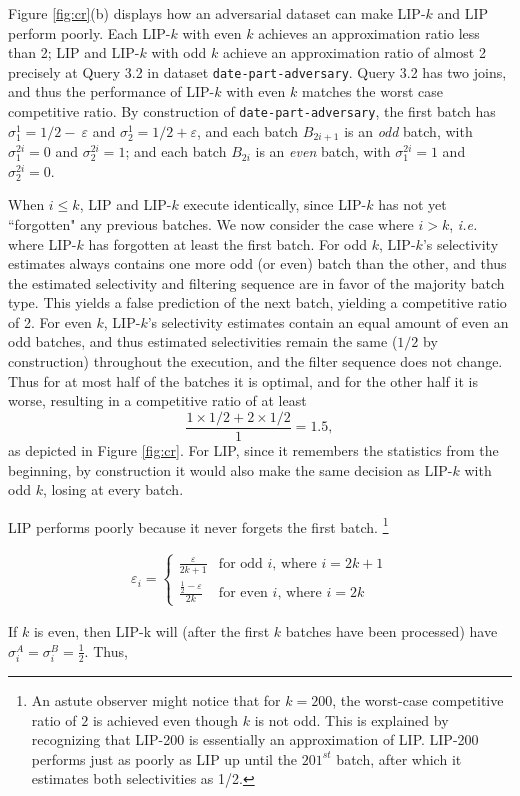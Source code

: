 Figure \ref{fig:cr}(b) displays how an adversarial dataset can make LIP-$k$ and LIP perform poorly. Each LIP-$k$ with even $k$ achieves an approximation ratio less than 2; LIP and LIP-$k$ with odd $k$ achieve an approximation ratio of almost 2 precisely at Query 3.2 in dataset \texttt{date-part-adversary}. Query 3.2 has two joins, and thus the performance of LIP-$k$ with even $k$ matches the worst case competitive ratio. By construction of \texttt{date-part-adversary}, the first batch has $\sigma^{1}_{1} = 1/2-\
\varepsilon$ and $\sigma^{1}_{2} = 1/2+\varepsilon$, and  each batch $B_{2i+1}$ is an \textit{odd} batch, with $\sigma^{2i}_{1} = 0$ and $\sigma^{2i}_{2} = 1$; and each batch $B_{2i}$ is an \textit{even} batch, with $\sigma^{2i}_{1} = 1$ and $\sigma^{2i}_{2} = 0$. 

When $i \leq k$, LIP and LIP-$k$ execute identically, since LIP-$k$ has not yet ``forgotten" any previous batches. We now consider the case where $i > k$, {\it i.e.} where LIP-$k$ has forgotten at least the first batch. For odd $k$, LIP-$k$'s selectivity estimates always contains one more odd (or even) batch than the other, and thus the estimated selectivity and filtering sequence are in favor of the majority batch type. This yields a false prediction of the next batch, yielding a competitive ratio of 2. For even $k$, LIP-$k$'s selectivity estimates contain an equal amount of even an odd batches,  and thus estimated selectivities remain the same ($1/2$ by construction) throughout the execution, and the filter sequence does not change. Thus for at most half of the batches it is optimal, and for the other half it is worse, resulting in a competitive ratio of at least \[ \frac{1 \times 1/2 + 2 \times 1/2}{1} = 1.5,\] as depicted in Figure \ref{fig:cr}. For LIP, since it remembers the statistics from the beginning, by construction it would also make the same decision as LIP-$k$ with odd $k$, losing at every batch. 

LIP performs poorly because it never forgets the first batch.
\footnote{An astute observer might notice that for $k = 200$, the worst-case competitive ratio of $2$ is achieved even though $k$ is not odd. This is explained by recognizing that LIP-200 is essentially an approximation of LIP. LIP-200 performs just as poorly as LIP up until  the $201^{st}$ batch, after which it estimates both selectivities as 1/2.}



\begin{align*}
\varepsilon_i = 
    \begin{cases}
    \frac{\varepsilon}{2k+1} & \text{for odd $i$, where $i = 2k + 1$} \\ 
    \frac{\frac{1}{2} - \varepsilon}{2k} & \text{for even $i$, where $i = 2k$}
    \end{cases}
\end{align*}

If $k$ is even, then LIP-k will (after the first $k$ batches have been processed) have $\sigma^A_i = \sigma^B_i = \frac{1}{2}$. Thus,


